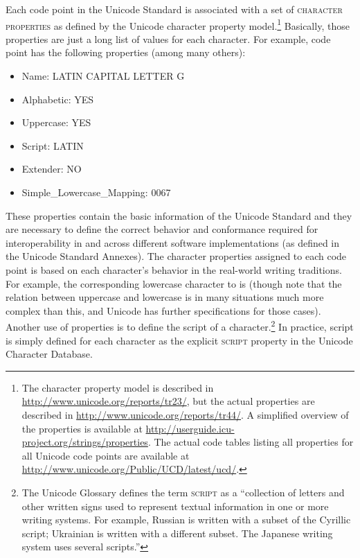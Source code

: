 Each code point in the Unicode Standard is associated with a set of
\textsc{character properties} as defined by the Unicode character property
model.\footnote{The character property model is described in
\url{http://www.unicode.org/reports/tr23/}, but the actual properties are
described in \url{http://www.unicode.org/reports/tr44/}. A simplified overview
of the properties is available at
\url{http://userguide.icu-project.org/strings/properties}. The actual code
tables listing all properties for all Unicode code points are available at
\url{http://www.unicode.org/Public/UCD/latest/ucd/}.} Basically, those
properties are just a long list of values for each character. For example, code
point  has the following properties (among many others): 
\begin{itemize}
	\item Name: LATIN CAPITAL LETTER G 
	\item Alphabetic: YES 
	\item Uppercase: YES 
	\item Script: LATIN 
	\item Extender: NO 
	\item Simple\_Lowercase\_Mapping: 0067 
\end{itemize}

These properties contain the basic information of the Unicode Standard and they
are necessary to define the correct behavior and conformance required for
interoperability in and across different software implementations (as defined in
the Unicode Standard Annexes). The character properties assigned to each code
point is based on each character's behavior in the real-world writing
traditions. For example, the corresponding lowercase character to  is
 (though note that the relation between uppercase and lowercase is in
many situations much more complex than this, and Unicode has further
specifications for those cases). Another use of properties is to define the
script of a character.\footnote{The Unicode Glossary defines the term \textsc{script} as
a ``collection of letters and other written signs used to represent textual
information in one or more writing systems. For example, Russian is written with
a subset of the Cyrillic script; Ukrainian is written with a different subset.
The Japanese writing system uses several scripts.''} In practice, script is
simply defined for each character as the explicit \textsc{script} property in
the Unicode Character Database.

